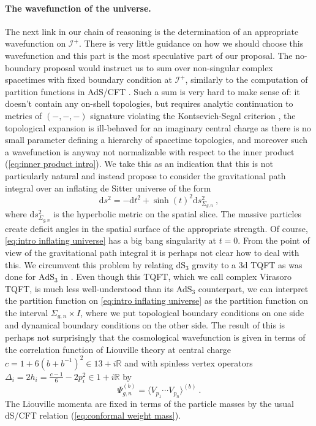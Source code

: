 \documentclass[12pt,a4paper]{article}
\newcommand{\be}{\begin{equation}}
\newcommand{\ee}{\end{equation}}
\newcommand\RR{\mathbb{R}}
\renewcommand\d{\text{d}}
\begin{document}
\paragraph{The wavefunction of the universe.} The next link in our chain of reasoning is the determination of an appropriate wavefunction on $\mathcal{I}^+$.
There is very little guidance on how we should choose this wavefunction and this part is the most speculative part of our proposal. 
The no-boundary proposal \cite{Hartle:1983ai} would instruct us to sum over non-singular complex spacetimes with fixed boundary condition at $\mathcal{I}^+$, similarly to the computation of partition functions in AdS/CFT \cite{Witten:1998qj}. Such a sum is very hard to make sense of: it doesn't contain any on-shell topologies, but requires analytic continuation to metrics of $(-,-,-)$ signature \cite{Castro:2012gc, Cotler:2019nbi, Godet:2024ich} violating the Kontsevich-Segal criterion \cite{Kontsevich:2021dmb, Witten:2021nzp}, the topological expansion is ill-behaved for an imaginary central charge as there is no small parameter defining a hierarchy of spacetime topologies, and moreover such a wavefunction is anyway not normalizable with respect to the inner product (\ref{eq:inner product intro}). We take this as an indication that this is not particularly natural and instead propose to consider the gravitational path integral over an inflating de Sitter universe of the form
\be 
\d s^2=-\d t^2+ \sinh(t)^2 \d s_{\Sigma_{g,n}}^2~, \label{eq:intro inflating universe}
\ee
where $\d s_{\Sigma_{g,n}}^2$ is the hyperbolic metric on the spatial slice. 
The massive particles create deficit angles in the spatial surface of the appropriate strength.
Of course, \eqref{eq:intro inflating universe} has a big bang singularity at $t=0$. From the point of view of the gravitational path integral it is perhaps not clear how to deal with this. We circumvent this problem by relating $\mathrm{dS}_3$ gravity to a 3d TQFT as was done for $\mathrm{AdS}_3$ in \cite{Collier:2023fwi}. Even though this TQFT, which we call complex Virasoro TQFT, is much less well-understood than its AdS$_3$ counterpart, we can interpret the partition function on \eqref{eq:intro inflating universe} as the partition function on the interval $\Sigma_{g,n} \times I$, where we put topological boundary conditions on one side and dynamical boundary conditions on the other side. 
The result of this is perhaps not surprisingly that the cosmological wavefunction is given in terms of the correlation function of Liouville theory at central charge $c=1+6(b+b^{-1})^2 \in 13+i \RR$ and with spinless vertex operators $\Delta_i=2h_i=\frac{c-1}{6}-2p_i^2 \in 1+i \RR$ by
\be 
\Psi_{g,n}^{(b)}=\langle V_{p_1} \cdots V_{p_n} \rangle^{(b)} ~.\label{eq:intro wavefunction Liouville}
\ee
The Liouville momenta are fixed in terms of the particle masses by the usual dS/CFT relation (\ref{eq:conformal weight mass}).
\end{document}

